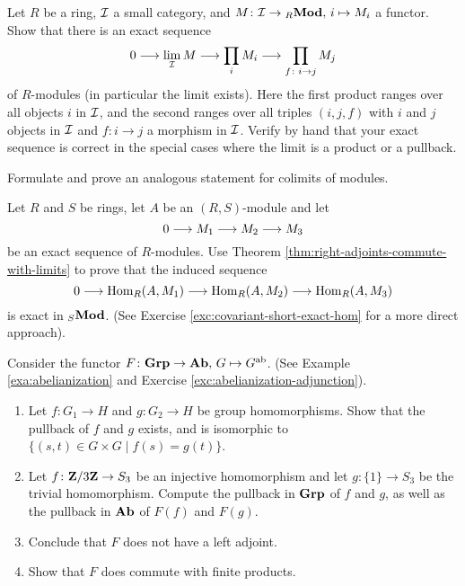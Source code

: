 \begin{exercise}
Let $R$ be a ring, ${\mathcal{I}}$ a small category, and $M\colon {\mathcal{I}} \to {}_R\mathbf{Mod},\, i \mapsto M_i$ a functor. Show that there is an exact sequence
\[
	0 \longrightarrow \lim_{\mathcal{I}} M \longrightarrow \prod_{i} M_i \longrightarrow \prod_{f\colon i\to j} M_j
\]
of $R$-modules (in particular the limit exists). Here the first product ranges over all objects $i$ in ${\mathcal{I}}$, and the second ranges over all triples $(i,j,f)$ with $i$ and $j$ objects in ${\mathcal{I}}$ and $f\colon i\to j$ a morphism in ${\mathcal{I}}$. Verify by hand that your exact sequence is correct in the special cases where the limit is a product or a pullback.
\end{exercise}

\begin{exercise}
Formulate and prove an analogous statement for colimits of modules.
\end{exercise}

\begin{exercise}
Let $R$ and $S$ be rings, let $A$ be an $(R,S)$-module and let 
\[
	0 \longrightarrow M_1 \longrightarrow M_2 \longrightarrow M_3
\]
be an exact sequence of $R$-modules. Use Theorem \ref{thm:right-adjoints-commute-with-limits} to prove that
the induced sequence
\[
	0 \longrightarrow \operatorname{Hom}_R(A,M_1) \longrightarrow \operatorname{Hom}_R(A,M_2) \longrightarrow \operatorname{Hom}_R(A,M_3)
\]
is exact in ${}_S\mathbf{Mod}$. (See Exercise \ref{exc:covariant-short-exact-hom} for a more direct approach). 
\end{exercise}

\begin{exercise}Consider the functor $F\colon \mathbf{Grp} \to \mathbf{Ab},\, G\mapsto G^{\mathrm{ab}}$. (See Example \ref{exa:abelianization} and Exercise \ref{exc:abelianization-adjunction}).
\begin{enumerate}
\item Let $f\colon G_1\to H$ and $g\colon G_2\to H$ be group homomorphisms. Show that the pullback of $f$ and $g$ exists, and is isomorphic to
$\{ (s,t)\in G\times G \mid f(s)=g(t) \}$.
\item Let $f\colon {\mathbf{Z}}/3{\mathbf{Z}} \to S_3$ be an injective homomorphism and let $g\colon \{1\}\to S_3$ be the trivial homomorphism. Compute the pullback in $\mathbf{Grp}$ of $f$ and $g$, as well as the pullback in $\mathbf{Ab}$ of $F(f)$ and $F(g)$.
\item Conclude that $F$ does not have a left adjoint.
\item Show that $F$ does commute with finite products. 
\end{enumerate}
\end{exercise}



